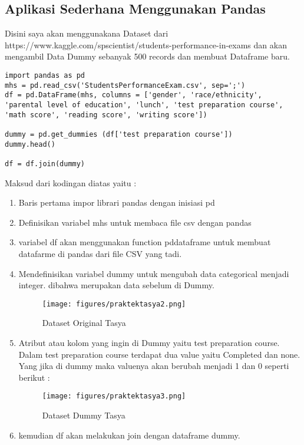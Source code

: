 \subsection{Aplikasi Sederhana Menggunakan Pandas}
Disini saya akan menggunakana Dataset dari https://www.kaggle.com/spscientist/students-performance-in-exams dan akan mengambil Data Dummy sebanyak 500 records dan membuat Dataframe baru.
\begin{verbatim}
import pandas as pd
mhs = pd.read_csv('StudentsPerformanceExam.csv', sep=';')
df = pd.DataFrame(mhs, columns = ['gender', 'race/ethnicity', 'parental level of education', 'lunch', 'test preparation course', 'math score', 'reading score', 'writing score'])

dummy = pd.get_dummies (df['test preparation course'])
dummy.head()

df = df.join(dummy)
\end{verbatim}
Maksud dari kodingan diatas yaitu :
\begin{enumerate}
\item Baris pertama impor librari pandas dengan inisiasi pd
\item Definisikan variabel mhs untuk membaca file csv dengan pandas
\item variabel df akan menggunakan function pddataframe untuk membuat datafarme di pandas dari file CSV yang tadi.
\item Mendefinisikan variabel dummy untuk mengubah data categorical menjadi integer. dibahwa merupakan data sebelum di Dummy.
\begin{figure}[ht]
\centering
\texttt{[image: figures/praktektasya2.png]}
\caption{Dataset Original Tasya}
\label{Aplikasi Pandas}
\end{figure}

\item Atribut atau kolom yang ingin di Dummy yaitu test preparation course. Dalam test preparation course terdapat dua value yaitu Completed dan none. Yang jika di dummy maka valuenya akan berubah menjadi 1 dan 0 seperti berikut :
\begin{figure}[ht]
\centering
\texttt{[image: figures/praktektasya3.png]}
\caption{Dataset Dummy Tasya}
\label{Aplikasi Pandas}
\end{figure}
\item kemudian df akan melakukan join dengan dataframe dummy.
\end{enumerate}

